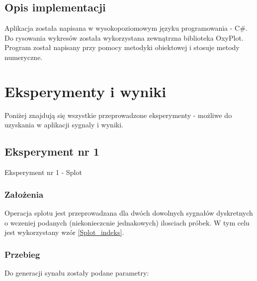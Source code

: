 \documentclass[12pt]{article}
\begin{document}
\subsection{Opis implementacji}
Aplikacja została napisana w wysokopoziomowym języku programowania - C\#. Do rysowania wykresów została wykorzystana zewnątrzna biblioteka OxyPlot. Program został napisany przy pomocy metodyki obiektowej i stosuje metody numeryczne.

\section{Eksperymenty i wyniki}

Poniżej znajdują się wszystkie przeprowadzone eksperymenty - możliwe do uzyskania w aplikacji sygnaly i wyniki. 


\subsection{Eksperyment nr 1}

Eksperyment nr 1 -  Splot\\


\subsubsection{Założenia}
Operacja splotu jest przeprowadzana dla dwóch dowolnych sygnałów dyskretnych o wczeniej podanych (niekonieczcnie jednakowych) ilosciach próbek. W tym celu jest wykorzystany wzór \ref{Splot_indeks}.

\subsubsection{Przebieg}
Do generacji synału zostały podane parametry:
\end{document}
